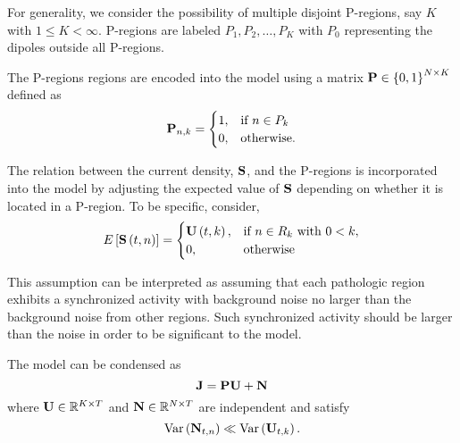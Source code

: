 For generality, we consider the possibility of multiple disjoint P-regions, say $K$ with $1\leq K < \infty$.
%
P-regions are labeled $P_1, P_2, \dots, P_K$ with $P_0$ representing the dipoles outside all P-regions.

The P-regions regions are encoded into the model using a matrix 
$\mathbf{P}\in \left\{ 0,1 \right\}^{N\times K}$ defined as
\begin{equation}
    \mathbf{P}_{n,k} = \begin{cases}
        1, &\text{if } n \in P_k \\
        0, &\text{otherwise.}
    \end{cases}
\end{equation}



The relation between the current density, $\mathbf{S}$, and the P-regions is incorporated into the model by adjusting the expected value of $\mathbf{S}$ depending on whether it is located in a P-region.
%
To be specific, consider,
\begin{equation}
    E\left[ \mathbf{S}\left( t,n \right) \right] = 
    \begin{cases}
        \mathbf{U}\left( t,k \right), & \text{if } n\in R_k \text{ with } 0<k, \\
        0, & \text{otherwise}
    \end{cases}
\end{equation}

This assumption can be interpreted as assuming that each pathologic region exhibits a synchronized activity with background noise no larger than the background noise from other regions.
%
Such synchronized activity should be larger than the noise in order to be significant to the model.

The model can be condensed as
\begin{equation}
    \mathbf{J} = \mathbf{P} \mathbf{U} + \mathbf{N}
\end{equation}
where $\mathbf{U}\in \mathbb{R}^{K\times T}$ and $\mathbf{N}\in \mathbb{R}^{N\times T}$ are independent and satisfy
\begin{equation}
    \text{Var}\left( \mathbf{N}_{t,n} \right) \ll \text{Var}\left( \mathbf{U}_{t,k} \right).
\end{equation}

